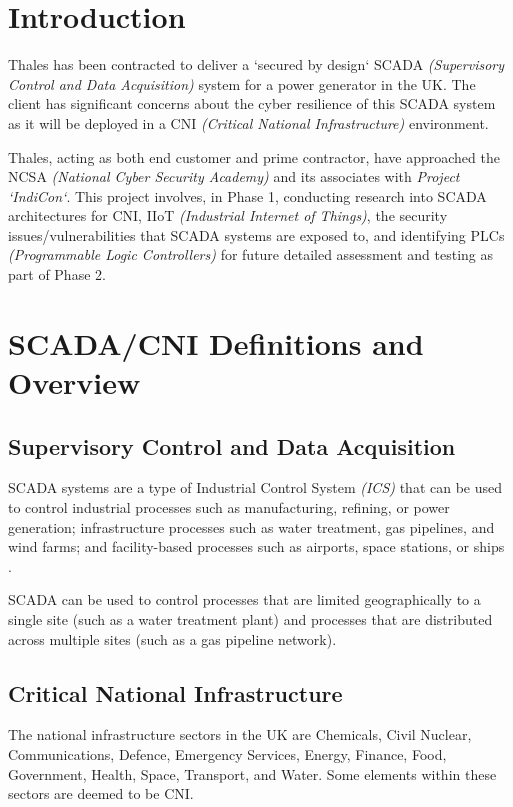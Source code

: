 \section{Introduction}
Thales has been contracted to deliver a `secured by design` SCADA \textit{(Supervisory Control and Data Acquisition)} system for a power generator in the UK. The client has significant concerns about the cyber resilience of this SCADA system as it will be deployed in a CNI \textit{(Critical National Infrastructure)} environment.

Thales, acting as both end customer and prime contractor, have approached the NCSA \textit{(National Cyber Security Academy)} and its associates with \textit{Project `IndiCon`}. This project involves, in Phase 1, conducting research into SCADA architectures for CNI, IIoT \textit{(Industrial Internet of Things)}, the security issues/vulnerabilities that SCADA systems are exposed to, and identifying PLCs \textit{(Programmable Logic Controllers)} for future detailed assessment and testing as part of Phase 2.


\section{SCADA/CNI Definitions and Overview}
\subsection{Supervisory Control and Data Acquisition}
SCADA systems are a type of Industrial Control System \textit{(ICS)} that can be used to control industrial processes such as manufacturing, refining, or power generation; infrastructure processes such as water treatment, gas pipelines, and wind farms; and facility-based processes such as airports, space stations, or ships \citep{site:scadasystems}.

SCADA can be used to control processes that are limited geographically to a single site (such as a water treatment plant) and processes that are distributed across multiple sites (such as a gas pipeline network).

\subsection{Critical National Infrastructure}
The national infrastructure sectors in the UK are Chemicals, Civil Nuclear, Communications, Defence, Emergency Services, Energy, Finance, Food, Government, Health, Space, Transport, and Water. Some elements within these sectors are deemed to be CNI.

